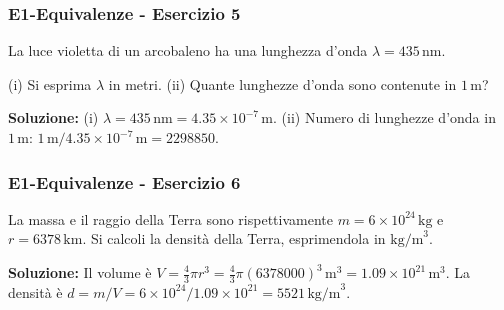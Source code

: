 \documentclass{beamer}
\begin{document}
\begin{frame}[fragile]
\frametitle{E1-Equivalenze - Esercizio 5}
La luce violetta di un arcobaleno ha una lunghezza d’onda \(\lambda = 435 \, \text{nm}\).

(i) Si esprima \(\lambda\) in metri.  
(ii) Quante lunghezze d’onda sono contenute in \(1 \, \text{m}\)?

\textbf{Soluzione:}  
(i) \(\lambda = 435 \, \text{nm} = 4.35 \times 10^{-7} \, \text{m}\).  
(ii) Numero di lunghezze d’onda in \(1 \, \text{m}\): \(1 \, \text{m} / 4.35 \times 10^{-7} \, \text{m} = 2298850\).
\end{frame}

\begin{frame}[fragile]
\frametitle{E1-Equivalenze - Esercizio 6}
La massa e il raggio della Terra sono rispettivamente \(m = 6 \times 10^{24} \, \text{kg}\) e \(r = 6378 \, \text{km}\). Si calcoli la densità della Terra, esprimendola in \( \text{kg/m}^3\).

\textbf{Soluzione:}  
Il volume è \(V = \frac{4}{3} \pi r^3 = \frac{4}{3} \pi (6378000)^3 \, \text{m}^3 = 1.09 \times 10^{21} \, \text{m}^3\).  
La densità è \(d = m / V = 6 \times 10^{24} / 1.09 \times 10^{21} = 5521 \, \text{kg/m}^3\).
\end{frame}
\end{document}
